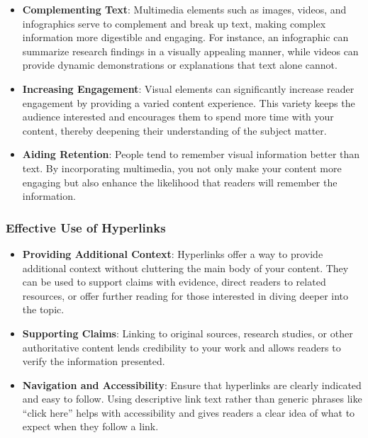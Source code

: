 \documentclass[
]{book}
\begin{document}
\begin{itemize}
\item
  \textbf{Complementing Text}: Multimedia elements such as images, videos, and infographics serve to complement and break up text, making complex information more digestible and engaging. For instance, an infographic can summarize research findings in a visually appealing manner, while videos can provide dynamic demonstrations or explanations that text alone cannot.
\item
  \textbf{Increasing Engagement}: Visual elements can significantly increase reader engagement by providing a varied content experience. This variety keeps the audience interested and encourages them to spend more time with your content, thereby deepening their understanding of the subject matter.
\item
  \textbf{Aiding Retention}: People tend to remember visual information better than text. By incorporating multimedia, you not only make your content more engaging but also enhance the likelihood that readers will remember the information.
\end{itemize}

\hypertarget{effective-use-of-hyperlinks}{%
\subsubsection*{Effective Use of Hyperlinks}\label{effective-use-of-hyperlinks}}

\begin{itemize}
\item
  \textbf{Providing Additional Context}: Hyperlinks offer a way to provide additional context without cluttering the main body of your content. They can be used to support claims with evidence, direct readers to related resources, or offer further reading for those interested in diving deeper into the topic.
\item
  \textbf{Supporting Claims}: Linking to original sources, research studies, or other authoritative content lends credibility to your work and allows readers to verify the information presented.
\item
  \textbf{Navigation and Accessibility}: Ensure that hyperlinks are clearly indicated and easy to follow. Using descriptive link text rather than generic phrases like ``click here'' helps with accessibility and gives readers a clear idea of what to expect when they follow a link.
\end{itemize}
\end{document}
